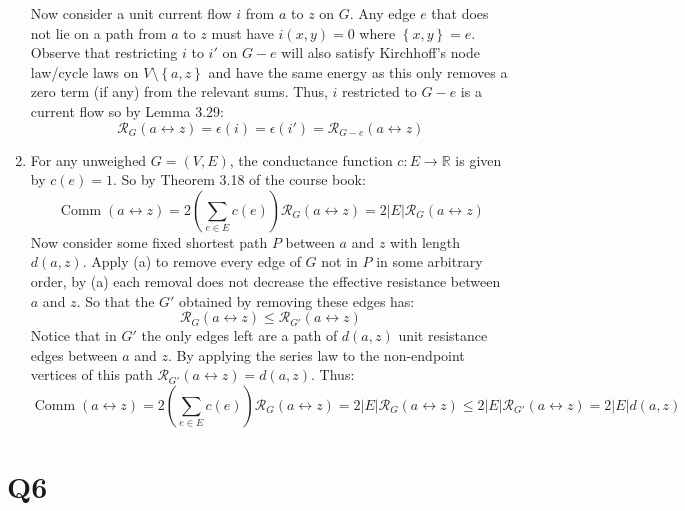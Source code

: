 \documentclass[a4paper, 11pt]{article}
\newcommand{\RR}{\mathbb{R}}
\def\set#1{\left\{ #1 \right\}}
\def\abs#1{\left|#1\right|}
\begin{document}
\begin{enumerate}[label=(\alph*)]
		Now consider a unit current flow $i$ from $a$ to $z$ on $G$. Any edge $e$ that does not lie on a path from $a$ to $z$ must have $i(x,y)=0$ where $\set{x,y}=e$. Observe that restricting $i$ to $i'$ on $G-e$ will also satisfy Kirchhoff's node law/cycle laws on $V\setminus\set{a,z}$ and have the same energy as this only removes a zero term (if any) from the relevant sums. Thus, $i$ restricted to $G-e$ is a current flow so by Lemma 3.29: 
		$$\mathcal{R}_G(a\leftrightarrow z)=\epsilon(i)=\epsilon(i')=\mathcal{R}_{G-e}(a\leftrightarrow z)$$
		
		\pagebreak
	   
		\item For any unweighed $G=(V,E)$, the conductance function $c:E\to\RR$ is given by $c(e)=1$. So by Theorem 3.18 of the course book: 
		\[
			\operatorname{Comm}(a\leftrightarrow z) = 2 \left( \sum_{e\in E} c(e)\right)	\mathcal{R}_G(a\leftrightarrow z) = 2\abs{E}\mathcal{R}_G(a\leftrightarrow z)
		\]
		Now consider some fixed shortest path $P$ between $a$ and $z$ with length $d(a,z)$. Apply (a) to remove every edge of $G$ not in $P$ in some arbitrary order, by (a) each removal does not decrease the effective resistance between $a$ and $z$. So that the $G'$ obtained by removing these edges has:
		\[
			\mathcal{R}_{G}(a\leftrightarrow z)	
			\leq \mathcal{R}_{G'}(a\leftrightarrow z)
		\]
		Notice that in $G'$ the only edges left are a path of $d(a,z)$ unit resistance edges between $a$ and $z$. By applying the series law to the non-endpoint vertices of this path $\mathcal{R}_{G'}(a\leftrightarrow z)=d(a,z)$. Thus:
	\[
		\operatorname{Comm}(a\leftrightarrow z) 
		= 2 \left( \sum_{e\in E} c(e)\right)\mathcal{R}_{G}(a\leftrightarrow z) 
		= 2\abs{E}\mathcal{R}_{G}(a\leftrightarrow z) 	
		\leq 2\abs{E}\mathcal{R}_{G'}(a\leftrightarrow z) 
		=2\abs{E}d(a,z)	
	\]


\end{enumerate}

\section*{Q6}

\end{document}
